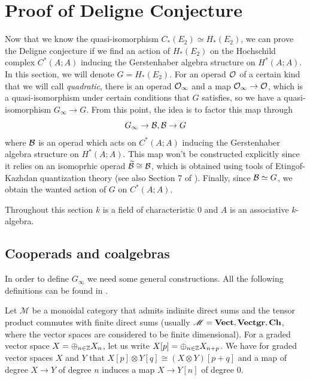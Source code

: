 \documentclass[TFM.tex]{subfiles}
\begin{document}
\chapter{Proof of Deligne Conjecture}


Now that we know the quasi-isomorphism $C_*(E_2)\simeq H_*(E_2)$, we can prove the Deligne conjecture if we find an action of $H_*(E_2)$ on the Hochschild complex $C^*(A;A)$ inducing the Gerstenhaber algebra structure on $H^*(A;A)$. In this section, we will denote $G=H_*(E_2)$. For an operad ${\mathcal O}$ of a certain kind that we will call \emph{quadratic}, there is an operad ${\mathcal O}_\infty$ and a map ${\mathcal O}_\infty\to{\mathcal O}$, which is a quasi-isomorphism under certain conditions that $G$ satisfies, so we have a quasi-isomorphism $G_\infty\to G$. From this point, the idea is to factor this map through
\[
G_\infty\to \mathcal{B},\mathcal{B}\to G
\]
where $\mathcal{B}$ is an operad which acts on $C^*(A;A)$ inducing the Gerstenhaber algebra structure on $H^*(A;A)$.  This map won't be constructed explicitly since it relies on an isomoprhic operad $\widetilde{\mathcal{B}}\cong\mathcal{B}$, which is obtained using tools of Etingof-Kazhdan quantization theory \cite{EK} (see also Section 7 of \cite{Hinich}). Finally, since $\mathcal{B}\simeq G$, we obtain the wanted action of $G$ on $C^*(A;A)$. 

Throughout this section $k$ is a field of characteristic 0 and $A$ is an associative $k$-algebra. 


\section{Cooperads and coalgebras}


In order to define $G_\infty$ we need some general constructions. All the following definitions can be found in \cite{Hinich}. 

Let $\mathscr{M}$ be a monoidal category that admits indinite direct sums and the tensor product commutes with finite direct sums (usually $\mathscr{M}=\mathrm{\mathbf{Vect}}, \mathrm{\mathbf{Vectgr}},\mathrm{\mathbf{Ch}}$, where the vector spaces are considered to be finite dimensional). For a graded vector space $X=\oplus_{n\in\mathbb{Z}}X_n$, let us write $X[p]=\oplus_{n\in\mathbb{Z}}X_{n+p}$. We have for graded vector spaces $X$ and $Y$ that $X[p]\otimes Y[q]\cong (X\otimes Y)[p+q]$ and a map of degree $X\to Y$ of degree $n$ induces a map $X\to Y[n]$ of degree 0. 
\end{document}
